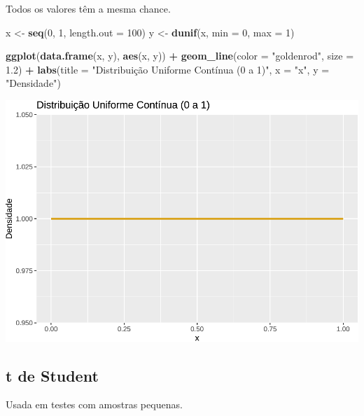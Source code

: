\documentclass[
]{book}
\newenvironment{Shaded}{\begin{snugshade}}{\end{snugshade}}
\newcommand{\AttributeTok}[1]{\textcolor[rgb]{0.13,0.29,0.53}{#1}}
\newcommand{\DecValTok}[1]{\textcolor[rgb]{0.00,0.00,0.81}{#1}}
\newcommand{\FloatTok}[1]{\textcolor[rgb]{0.00,0.00,0.81}{#1}}
\newcommand{\FunctionTok}[1]{\textcolor[rgb]{0.13,0.29,0.53}{\textbf{#1}}}
\newcommand{\NormalTok}[1]{#1}
\newcommand{\OtherTok}[1]{\textcolor[rgb]{0.56,0.35,0.01}{#1}}
\newcommand{\SpecialCharTok}[1]{\textcolor[rgb]{0.81,0.36,0.00}{\textbf{#1}}}
\newcommand{\StringTok}[1]{\textcolor[rgb]{0.31,0.60,0.02}{#1}}
\begin{document}
Todos os valores têm a mesma chance.

\begin{Shaded}
\begin{Highlighting}[]
\NormalTok{x }\OtherTok{\textless{}{-}} \FunctionTok{seq}\NormalTok{(}\DecValTok{0}\NormalTok{, }\DecValTok{1}\NormalTok{, }\AttributeTok{length.out =} \DecValTok{100}\NormalTok{)}
\NormalTok{y }\OtherTok{\textless{}{-}} \FunctionTok{dunif}\NormalTok{(x, }\AttributeTok{min =} \DecValTok{0}\NormalTok{, }\AttributeTok{max =} \DecValTok{1}\NormalTok{)}

\FunctionTok{ggplot}\NormalTok{(}\FunctionTok{data.frame}\NormalTok{(x, y), }\FunctionTok{aes}\NormalTok{(x, y)) }\SpecialCharTok{+}
  \FunctionTok{geom\_line}\NormalTok{(}\AttributeTok{color =} \StringTok{"goldenrod"}\NormalTok{, }\AttributeTok{size =} \FloatTok{1.2}\NormalTok{) }\SpecialCharTok{+}
  \FunctionTok{labs}\NormalTok{(}\AttributeTok{title =} \StringTok{"Distribuição Uniforme Contínua (0 a 1)"}\NormalTok{, }\AttributeTok{x =} \StringTok{"x"}\NormalTok{, }\AttributeTok{y =} \StringTok{"Densidade"}\NormalTok{)}
\end{Highlighting}
\end{Shaded}

\includegraphics{Livro-Estatistica+R_files/figure-latex/uniforme-1.pdf}

\subsection{t de Student}\label{t-de-student}

Usada em testes com amostras pequenas.
\end{document}
